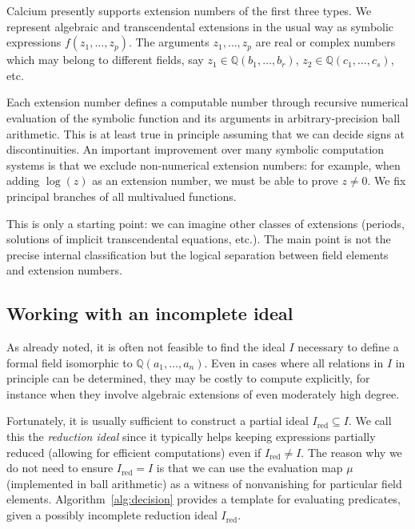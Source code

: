 \documentclass[sigconf,screen,urlbreakonhyphens]{acmart}
\begin{document}
Calcium presently supports extension numbers of the first three types.
We represent algebraic and transcendental extensions
in the usual way as symbolic expressions $f(z_1,\ldots,z_p)$.
The arguments $z_1, \ldots, z_p$ are real or complex numbers
which may belong to different fields, say $z_1 \in \mathbb{Q}(b_1,\ldots,b_r)$,
$z_2 \in \mathbb{Q}(c_1,\ldots,c_s)$, etc.

Each extension number defines a computable number
through recursive numerical evaluation of the symbolic function
and its arguments in arbitrary-precision ball arithmetic.
This is at least true in principle
assuming that we can decide signs at discontinuities.
An important improvement
over many symbolic computation systems
is that we exclude non-numerical extension numbers: for example,
when adding $\log(z)$ as an extension number, we must be
able to prove $z \ne 0$.
We fix principal branches of all multivalued functions.

This is only a starting point: we can imagine other classes of extensions (periods, solutions of
implicit transcendental equations, etc.).
The main point
is not the precise internal classification but the
logical separation between field elements
and extension numbers.

\subsection{Working with an incomplete ideal}

\label{sect:incompleteideal}

As already noted, it is often not feasible
to find the ideal $I$ necessary to define
a formal field isomorphic to $\mathbb{Q}(a_1,\ldots,a_n)$.
Even in cases where all relations in $I$ in principle can be determined,
they may be costly to compute explicitly,
for instance when they involve algebraic
extensions of even moderately high degree.

Fortunately, it is usually sufficient to construct a partial ideal $I_{\text{red}} \subseteq I$.
We call this the \emph{reduction ideal}
since it typically helps keeping expressions partially reduced
(allowing for efficient computations) even if $I_{\text{red}} \ne I$.
The reason why we do not need to ensure $I_{\text{red}} = I$ is that we can use
the evaluation map $\mu$ (implemented in ball arithmetic)
as a witness of nonvanishing for particular field elements.
Algorithm~\ref{alg:decision} provides
a template for evaluating predicates,
given a possibly incomplete reduction ideal $I_{\text{red}}$.
\end{document}
